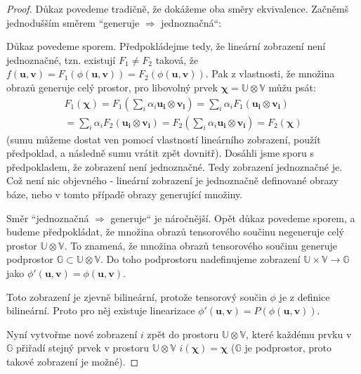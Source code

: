 \documentclass[a5paper,12pt]{amsbook}
\theoremstyle{definition}
\newcommand{\myvec}[1]{\bm{#1}}
\newcommand{\myspace}[1]{\mathbb{#1}}
\begin{document}
\begin{proof}
Důkaz povedeme tradičně, že dokážeme oba směry ekvivalence. Začněmš jednodušším směrem
``generuje $\Rightarrow$ jednoznačná``:

\medskip\noindent
Důkaz povedeme sporem. Předpokládejme tedy, že lineární zobrazení není jednoznačné,
tzn. existují $F_1 \neq F_2$ taková, že
$f(\myvec{u}, \myvec{v}) = F_1(\phi(\myvec{u}, \myvec{v})) = F_2(\phi(\myvec{u}, \myvec{v}))$.
Pak z vlastnosti, že množina obrazů generuje celý prostor, pro libovolný prvek $\myvec{\chi} = \myspace{U}\otimes\myspace{V}$ můžu psát:
\begin{equation*}
\begin{split}
F_1(\myvec{\chi}) = F_1(\sum_{i}\alpha_i\myvec{u_i}\otimes\myvec{v_i})
= \sum_{i}\alpha_i F_1(\myvec{u_i}\otimes\myvec{v_i}) \\
= \sum_{i}\alpha_i F_2(\myvec{u_i}\otimes\myvec{v_i})
= F_2(\sum_{i}\alpha_i\myvec{u_i}\otimes\myvec{v_i}) = F_2(\myvec{\chi})
\end{split}
\end{equation*}
(sumu můžeme dostat ven pomocí vlastností lineárního zobrazení, použít předpoklad, a následně
sumu vrátit zpět dovnitř). Dosáhli jsme sporu s předpokladem, že zobrazení není jednoznačné.
Tedy zobrazení jednoznačné je. Což není nic objevného - lineární zobrazení je jednoznačně
definované obrazy báze, nebo v tomto případě obrazy generující množiny.

\medskip\noindent
Směr ``jednoznačná $\Rightarrow$ generuje`` je náročnější. Opět důkaz povedeme sporem, a budeme
předpokládat, že množina obrazů tensorového součinu negeneruje celý prostor
$\myspace{U}\otimes\myspace{V}$. To znamená, že množina obrazů tensorového součinu generuje
podprostor $\myspace{G}\subset\myspace{U}\otimes\myspace{V}$. Do toho podprostoru nadefinujeme
zobrazení $\myspace{U}\times\myspace{V}\rightarrow\myspace{G}$ jako
$\phi'(\myvec{u}, \myvec{v}) = \phi(\myvec{u}, \myvec{v})$.
\begin{center}

\end{center}
Toto zobrazení je zjevně bilineární, protože tensorový součin $\phi$ je z definice bilineární.
Proto pro něj existuje linearizace $\phi'(\myvec{u}, \myvec{v}) = P(\phi(\myvec{u}, \myvec{v}))$.

Nyní vytvořme nové zobrazení $i$ zpět do prostoru $\myspace{U}\otimes\myspace{V}$, které každému
prvku v $\myspace{G}$ přiřadí stejný prvek v prostoru $\myspace{U}\otimes\myspace{V}$
$i(\myvec{\chi}) = \myvec{\chi}$ ($\myspace{G}$ je podprostor, proto takové zobrazení je možné).


\end{proof}
\end{document}
